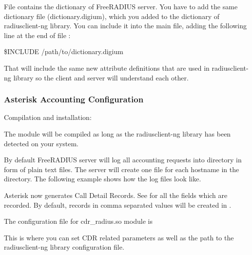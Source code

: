 	File  contains the dictionary of
	FreeRADIUS server. You have to add the same dictionary file
	(dictionary.digium), which you added to the dictionary of radiusclient-ng
	library. You can include it into the main file, adding the following line at the
	end of file :

	\$INCLUDE /path/to/dictionary.digium

	That will include the same new attribute definitions that are used
	in radiusclient-ng library so the client and server will understand each
	other.


\subsubsection{Asterisk Accounting Configuration}

	Compilation and installation:

        The module will be compiled as long as the radiusclient-ng
        library has been detected on your system.

	By default FreeRADIUS server will log all accounting requests into
	 directory in form of plain text files.
	The server will create one file for each hostname in the directory. The
	following example shows how the log files look like.

	Asterisk now generates Call Detail Records. See 
	for all the fields which are recorded. By default, records in comma
	separated values will be created in .

	The configuration file for cdr\_radius.so module is 

	This is where you can set CDR related parameters as well as the path to
	the radiusclient-ng library configuration file.


